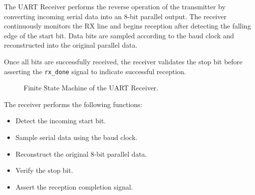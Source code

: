 The UART Receiver performs the reverse operation of the transmitter by converting incoming serial data into an 8-bit parallel output. The receiver continuously monitors the RX line and begins reception after detecting the falling edge of the start bit. Data bits are sampled according to the baud clock and reconstructed into the original parallel data.

Once all bits are successfully received, the receiver validates the stop bit before asserting the \texttt{rx\_done} signal to indicate successful reception.

\begin{figure}[!htbp]
\centering


\caption{Finite State Machine of the UART Receiver.}
\label{fig:rx_fsm}

\end{figure}


\vspace{0.3cm}

The receiver performs the following functions:

\begin{itemize}

\item Detect the incoming start bit.

\item Sample serial data using the baud clock.

\item Reconstruct the original 8-bit parallel data.

\item Verify the stop bit.

\item Assert the reception completion signal.

\end{itemize}

